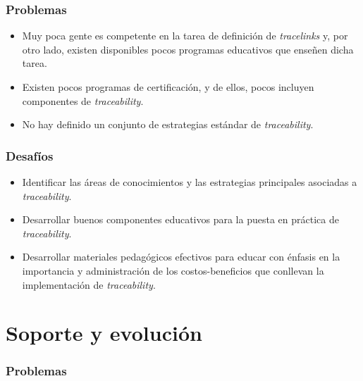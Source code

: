 \documentclass[a4paper,12pt,oneside,spanish]{book}
\begin{document}
\subsubsection{Problemas}

\begin{itemize}[label={$\times$}]
\item Muy poca gente es competente en la tarea de definición de \textit{tracelinks} y, por otro lado, existen disponibles pocos programas educativos que enseñen dicha tarea.

\item Existen pocos programas de certificación, y de ellos, pocos incluyen componentes de \textit{traceability}.

\item No hay definido un conjunto de estrategias estándar de \textit{traceability}.

\end{itemize}

\subsubsection{Desafíos}

\begin{itemize}[label={\checkmark}]
\item Identificar las áreas de conocimientos y las estrategias principales asociadas a \textit{traceability}.

\item Desarrollar buenos componentes educativos para la puesta en práctica de \textit{traceability}.

\item Desarrollar materiales pedagógicos efectivos para educar con énfasis en la importancia y administración de los costos-beneficios que conllevan la implementación de \textit{traceability}.

\end{itemize}

\section{Soporte y evolución}

\subsubsection{Problemas}
\end{document}

